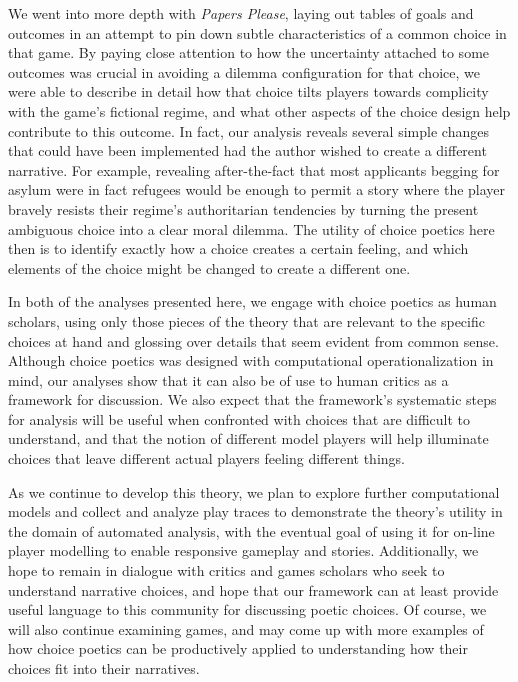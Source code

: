 \documentclass[arts,article,submit,moreauthors,pdftex,10pt,a4paper]{Definitions/mdpi}
\begin{document}
We went into more depth with \emph{Papers Please}, laying out tables of goals and outcomes in an attempt to pin down subtle characteristics of a common choice in that game.
%
By paying close attention to how the uncertainty attached to some outcomes was crucial in avoiding a dilemma configuration for that choice, we were able to describe in detail how that choice tilts players towards complicity with the game's fictional regime, and what other aspects of the choice design help contribute to this outcome.
%
In fact, our analysis reveals several simple changes that could have been implemented had the author wished to create a different narrative.
%
For example, revealing after-the-fact that most applicants begging for asylum were in fact refugees would be enough to permit a story where the player bravely resists their regime's authoritarian tendencies by turning the present ambiguous choice into a clear moral dilemma.
%
The utility of choice poetics here then is to identify exactly how a choice creates a certain feeling, and which elements of the choice might be changed to create a different one.


In both of the analyses presented here, we engage with choice poetics as human scholars, using only those pieces of the theory that are relevant to the specific choices at hand and glossing over details that seem evident from common sense.
%
Although choice poetics was designed with computational operationalization in mind, our analyses show that it can also be of use to human critics as a framework for discussion.
%
We also expect that the framework's systematic steps for analysis will be useful when confronted with choices that are difficult to understand, and that the notion of different model players will help illuminate choices that leave different actual players feeling different things.


As we continue to develop this theory, we plan to explore further computational models and collect and analyze play traces to demonstrate the theory's utility in the domain of automated analysis, with the eventual goal of using it for on-line player modelling to enable responsive gameplay and stories.
%
Additionally, we hope to remain in dialogue with critics and games scholars who seek to understand narrative choices, and hope that our framework can at least provide useful language to this community for discussing poetic choices.
%
Of course, we will also continue examining games, and may come up with more examples of how choice poetics can be productively applied to understanding how their choices fit into their narratives.
\end{document}
